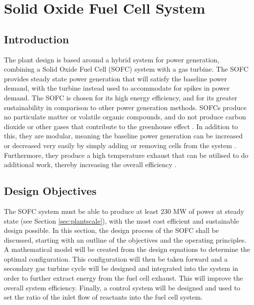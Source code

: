 \documentclass{article}
\begin{document}

\section{Solid Oxide Fuel Cell System}


\subsection{Introduction}
The plant design is based around a hybrid system for power generation, combining a Solid Oxide Fuel Cell (SOFC) system with a gas turbine. The SOFC provides steady state power generation that will satisfy the baseline power demand, with the turbine instead used to accommodate for spikes in power demand. The SOFC is chosen for its high energy efficiency, and for its greater sustainability in comparison to other power generation methods. SOFCs produce no particulate matter or volatile organic compounds, and do not produce carbon dioxide or other gases that contribute to the greenhouse effect \cite{LM2}. In addition to this, they are modular, meaning the baseline power generation can be increased or decreased very easily by simply adding or removing cells from the system \cite{PR2}. Furthermore, they produce a high temperature exhaust that can be utilised to do additional work, thereby increasing the overall efficiency \cite{LM3}.


\subsection{Design Objectives}
The SOFC system must be able to produce at least 230 MW of power at steady state (see Section \ref{sec:plantscale}), with the most cost efficient and sustainable design possible. 
In this section, the design process of the SOFC shall be discussed, starting with an outline of the objectives and the operating principles. A mathematical model will be created from the design equations to determine the optimal configuration. This configuration will then be taken forward and a secondary gas turbine cycle will be designed and integrated into the system in order to further extract energy from the fuel cell exhaust. This will improve the overall system efficiency. Finally, a control system will be designed and used to set the ratio of the inlet flow of reactants into the fuel cell system.
\end{document}
